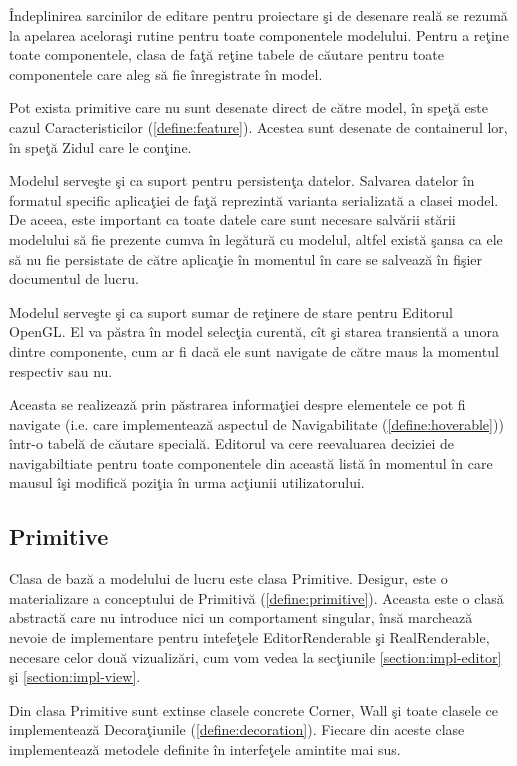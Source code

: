 Îndeplinirea sarcinilor de editare pentru proiectare şi de desenare reală se 
rezumă la apelarea aceloraşi rutine pentru toate componentele modelului. Pentru 
a reţine toate componentele, clasa de faţă reţine tabele de căutare pentru 
toate componentele care aleg să fie înregistrate în model.

Pot exista primitive care nu sunt desenate direct de către model, în speţă este 
cazul Caracteristicilor (\ref{define:feature}). Acestea sunt desenate de 
containerul lor, în speţă Zidul care le conţine.

Modelul serveşte şi ca suport pentru persistenţa datelor. Salvarea datelor în 
formatul specific aplicaţiei de faţă reprezintă varianta serializată a clasei 
model. De aceea, este important ca toate datele care sunt necesare salvării 
stării modelului să fie prezente cumva în legătură cu modelul, altfel există 
şansa ca ele să nu fie persistate de către aplicaţie în momentul în care se 
salvează în fişier documentul de lucru.

Modelul serveşte şi ca suport sumar de reţinere de stare pentru Editorul 
OpenGL. El va păstra în model selecţia curentă, cît şi starea transientă a 
unora dintre componente, cum ar fi dacă ele sunt navigate de către maus la 
momentul respectiv sau nu.

Aceasta se realizează prin păstrarea informaţiei despre elementele ce pot fi 
navigate (i.e. care implementează aspectul de Navigabilitate 
(\ref{define:hoverable})) într-o tabelă de căutare specială. Editorul va cere 
reevaluarea deciziei de navigabiltiate pentru toate componentele din această 
listă în momentul în care mausul îşi modifică poziţia în urma acţiunii 
utilizatorului.

\subsection{Primitive}
Clasa de bază a modelului de lucru este clasa Primitive. Desigur, este o 
materializare a conceptului de Primitivă (\ref{define:primitive}). Aceasta este 
o clasă abstractă care nu introduce nici un comportament singular, însă 
marchează nevoie de implementare pentru intefeţele EditorRenderable şi 
RealRenderable, necesare celor două vizualizări, cum vom vedea la secţiunile 
\ref{section:impl-editor} şi \ref{section:impl-view}.

Din clasa Primitive sunt extinse clasele concrete Corner, Wall şi toate clasele 
ce implementează Decoraţiunile (\ref{define:decoration}). Fiecare din aceste 
clase implementează metodele definite în interfeţele amintite mai sus.

